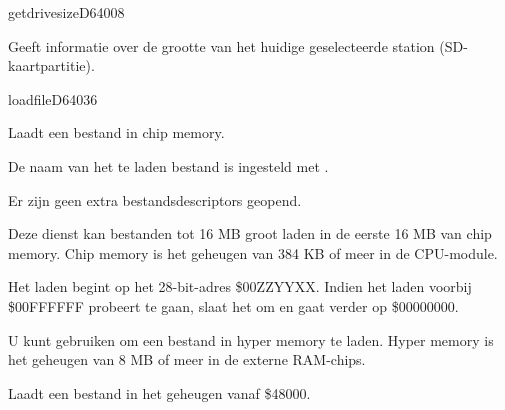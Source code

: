 \newpage
\begin{hyppotrap}{getdrivesize}{D640}{08}
\item [Dienst:]  Geeft informatie over de grootte van het huidige geselecteerde station (SD-kaartpartitie).
\notimplemented
\end{hyppotrap}


\newpage
\begin{hyppotrap}{loadfile}{D640}{36}

\item [Dienst:]  Laadt een bestand in chip memory.
\item [Voorwaarden:]  De naam van het te laden bestand is ingesteld met .
\item [Invoer:]      
\item [Nawerkingen:]  Er zijn geen extra bestandsdescriptors geopend.
\item [Foutcodes:]    
\item [Geschiedenis:]
\item [Opmerkingen:]  Deze dienst kan bestanden tot 16 MB groot laden in de eerste 16 MB van chip memory. Chip memory is het geheugen van 384 KB of meer in de CPU-module.

  Het laden begint op het 28-bit-adres \$00ZZYYXX. Indien het laden voorbij \$00FFFFFF probeert te gaan, slaat het om en gaat verder op \$00000000.

  U kunt  gebruiken om een bestand in hyper memory te laden. Hyper memory is het geheugen van 8 MB of meer in de externe RAM-chips.\item [Voorbeeld:]  Laadt een bestand in het geheugen vanaf \$48000.
\end{hyppotrap}


